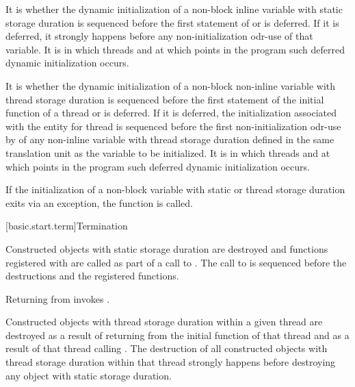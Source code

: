 \pnum
It is 
whether the dynamic initialization of a
non-block inline variable with static storage duration
is sequenced before the first statement of  or is deferred.
If it is deferred, it strongly happens before
any non-initialization odr-use
of that variable.
It is 
in which threads and at which points in the program such deferred dynamic initialization occurs.

\pnum
It is 
whether the dynamic initialization of a
non-block non-inline variable with thread storage duration
is sequenced before the first statement of the initial function of a thread or is deferred.
If it is deferred,
the initialization associated with the entity for thread 
is sequenced before the first non-initialization odr-use by 
of any non-inline variable with thread storage duration
defined in the same translation unit as the variable to be initialized.
It is 
in which threads and at which points in the program such deferred dynamic initialization occurs.

\pnum
If the initialization of
a non-block variable with static or thread storage duration
exits via an exception,
the function  is called.%

[basic.start.term]{Termination}

\pnum
{}%
%
%
Constructed objects
with static storage duration are destroyed
and functions registered with 
are called as part of a call to
%
%
.
The call to  is sequenced before
the destructions and the registered functions.
\begin{note}
Returning from  invokes .
\end{note}

\pnum
Constructed objects with thread storage duration within a given thread
are destroyed as a result of returning from the initial function of that thread and as a
result of that thread calling .
The destruction of all constructed objects with thread storage
duration within that thread strongly happens before destroying
any object with static storage duration.

